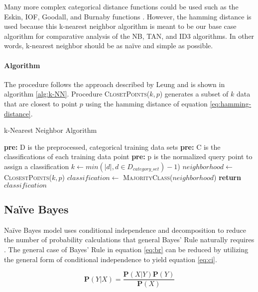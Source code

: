 Many more complex categorical distance functions could be used such as the Eskin, IOF, Goodall, and Burnaby functions \cite{Boriah}.
However, the hamming distance is used because this k-nearest neighbor algorithm is meant to be our base case algorithm for comparative analysis of the NB, TAN, and ID3 algorithms. 
In other words, k-nearest neighbor should be as na\"{i}ve and simple as possible.

\paragraph{Algorithm}
The procedure follows the approach described by Leung \cite{Leung} and is shown in algorithm \ref{alg:k-NN}.
Procedure \textsc{ClosetPoints}($k,p$) generates a subset of $k$ data that are closest to point $p$ using the hamming distance of equation \ref{eq:hamming-distance}.

\begin{algorithm}
\caption{k-Nearest Neighbor Algorithm}\label{alg:k-NN}
\begin{algorithmic}[1]
	\State \textbf{pre:} D is the preprocessed, categorical training data sets
    \State \textbf{pre:} C is the classifications of each training data point
    \State \textbf{pre:} p is the normalized query point to assign a classification
    \State $k \gets min(|d|, d \in D_{category\_set}) - 1$)
    \State $neighborhood \gets$ \textsc{ClosestPoints($k, p$)}
    \State $classification \gets$ \textsc{MajorityClass}($neighborhood$)  
    \State \textbf{return} $classification$
\EndProcedure
\end{algorithmic}
\end{algorithm}

\subsection{Na\"{i}ve Bayes}
Na\"ive Bayes model uses conditional independence and decomposition to reduce the number of probability calculations that general Bayes' Rule naturally requires \cite{Russell}. The general case of Bayes' Rule in equation \ref{eq:br} can be reduced by utilizing the general form of conditional independence to yield equation \ref{eq:ci}.

\begin{equation}\label{eq:br}
	\boldsymbol P(Y | X) = \frac{\boldsymbol P(X | Y) \boldsymbol P(Y)}{\boldsymbol P(X)} 
\end{equation}

